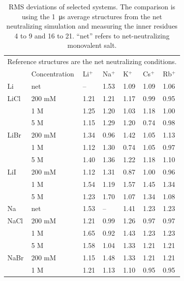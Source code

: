 \documentclass[9pt,lessons]{livecoms}
\begin{document}
\begin{table}[]
\caption{RMS deviations of selected systems.  The comparison is using the \SI{1}{\micro\second} average structures from the net neutralizing simulation and measuring the inner residues 4 to 9 and 16 to 21. “net” refers to net-neutralizing monovalent salt.}
\label{1us-rmsd-net-inner}
\begin{tabular}{lllllll}
\multicolumn{7}{l}{Reference structures are the net neutralizing conditions.} \\
         & Concentration    & Li$^{+}$      & Na$^{+}$ & K$^{+}$ & Cs$^{+}$ & Rb$^{+}$      \\
Li       & net              & --      & 1.53    & 1.09    & 1.09    & 1.06    \\
LiCl     & 200 mM           & 1.21    & 1.21    & 1.17    & 0.99    & 0.95    \\
         & 1 M              & 1.25    & 1.20    & 1.03    & 1.18    & 1.00    \\
         & 5 M              & 1.15    & 1.29    & 1.20    & 0.74    & 0.98    \\
LiBr     & 200 mM           & 1.34    & 0.96    & 1.42    & 1.05    & 1.13    \\
         & 1 M              & 1.12    & 1.30    & 0.74    & 1.05    & 0.97    \\
         & 5 M              & 1.40    & 1.36    & 1.22    & 1.18    & 1.10    \\
LiI      & 200 mM           & 1.12    & 1.31    & 0.87    & 1.00    & 0.96    \\
         & 1 M              & 1.54    & 1.19    & 1.57    & 1.45    & 1.34    \\
         & 5 M              & 1.23    & 1.70    & 1.07    & 1.34    & 1.08    \\
Na       & net              & 1.53    & --      & 1.41    & 1.23    & 1.23    \\
NaCl     & 200 mM           & 1.21    & 0.99    & 1.26    & 0.97    & 0.97    \\
         & 1 M              & 1.65    & 0.92    & 1.43    & 1.23    & 1.23    \\
         & 5 M              & 1.58    & 1.04    & 1.33    & 1.21    & 1.21    \\
NaBr     & 200 mM           & 1.15    & 1.48    & 1.33    & 1.21    & 1.21    \\
         & 1 M              & 1.21    & 1.13    & 1.10    & 0.95    & 0.95    \\

\end{tabular}
\end{table}
\end{document}
